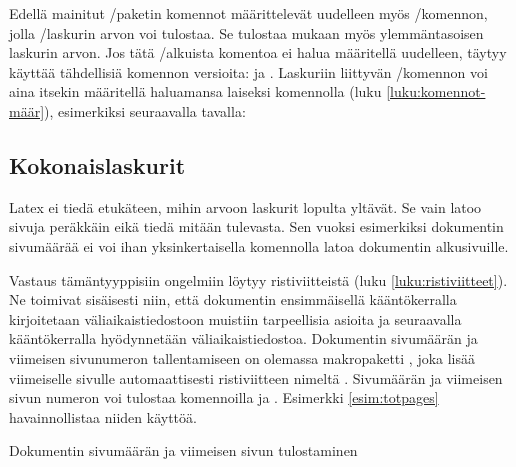 \begin{koodilohkosis}
\end{koodilohkosis}

Edellä mainitut \-/paketin komennot määrittelevät
uudelleen myös \-/komennon, jolla
\-/laskurin arvon voi tulostaa. Se tulostaa mukaan myös
ylemmäntasoisen laskurin arvon. Jos tätä \-/alkuista
komentoa ei halua määritellä uudelleen, täytyy käyttää tähdellisiä
komennon versioita:  ja . Laskuriin liittyvän \-/komennon
voi aina itsekin määritellä haluamansa laiseksi komennolla  (luku \ref{luku:komennot-määr}), esimerkiksi seuraavalla
tavalla:

\begin{koodilohkosis}
  \renewcommand{\theoma}{\arabic{page}/\alph{oma}}
\end{koodilohkosis}

\subsection{Kokonaislaskurit}

Latex ei tiedä etukäteen, mihin arvoon laskurit lopulta yltävät. Se vain
latoo sivuja peräkkäin eikä tiedä mitään tulevasta. Sen vuoksi
esimerkiksi dokumentin sivumäärää ei voi ihan yksinkertaisella
komennolla latoa dokumentin alkusivuille.

Vastaus tämäntyyppisiin ongelmiin löytyy ristiviitteistä (luku
\ref{luku:ristiviitteet}). Ne toimivat sisäisesti niin, että dokumentin
ensimmäisellä kääntökerralla kirjoitetaan väliaikaistiedostoon muistiin
tarpeellisia asioita ja seuraavalla kääntökerralla hyödynnetään
väliaikaistiedostoa. Dokumentin sivumäärän ja viimeisen sivunumeron
tallentamiseen on olemassa makropaketti
, joka lisää viimeiselle sivulle
automaattisesti ristiviitteen nimeltä . Sivumäärän ja
viimeisen sivun numeron voi tulostaa komennoilla  ja
. Esimerkki \ref{esim:totpages} havainnollistaa
niiden käyttöä.

\begin{esimerkki*}
\caption{Dokumentin sivumäärän ja viimeisen sivun tulostaminen}
\label{esim:totpages}
\end{esimerkki*}

